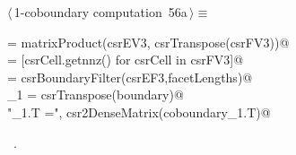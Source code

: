 \documentclass[11pt,oneside]{article}    %
\begin{document}
\begin{flushleft} \small \label{scrap95}
\protect{}$\langle\,$1-coboundary computation\nobreak\ {\footnotesize 56a}$\,\rangle\equiv$
\vspace{-1ex}
\begin{list}{}{} \item
\mbox{} = matrixProduct(csrEV3, csrTranspose(csrFV3))@\\
\mbox{}\verb@facetLengths = [csrCell.getnnz() for csrCell in csrFV3]@\\
\mbox{}\verb@boundary = csrBoundaryFilter(csrEF3,facetLengths)@\\
\mbox{}\verb@coboundary_1 = csrTranspose(boundary)@\\
\mbox{}\verb@print "\ncoboundary_1.T =\n", csr2DenseMatrix(coboundary_1.T)@\\
\mbox{}\verb@@{\NWsep}
\end{list}
\vspace{-1ex}
\footnotesize\addtolength{\baselineskip}{-1ex}
\begin{list}{}{\setlength{\itemsep}{-\parsep}\setlength{\itemindent}{-\leftmargin}}
\item \NWtxtMacroRefIn\ .
\end{list}
\end{flushleft}
\end{document}
